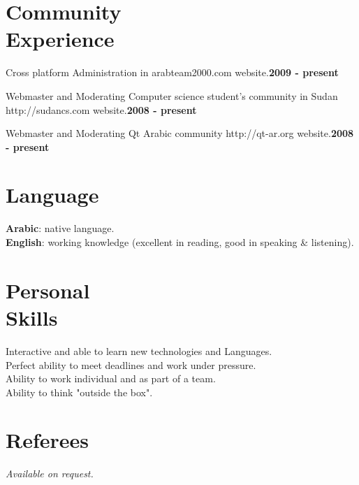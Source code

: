 \documentclass[margin,line]{resume}
\begin{document}
\begin{resume}
\vspace{-2mm}


\section{\mysidestyle  Community\\Experience} 
Cross platform Administration in arabteam2000.com website.\hfill \textbf{2009 - present}\vspace{-3mm}\\\vspace{-1mm}

Webmaster and Moderating Computer science student's community in Sudan http://sudancs.com website.\hfill \textbf{2008 - present}\vspace{-3mm}\\\vspace{-1mm}

Webmaster and Moderating Qt Arabic community http://qt-ar.org website.\hfill \textbf{2008 - present}\vspace{-3mm}\\\vspace{-1mm}

\section{\mysidestyle Language}
	\textbf{Arabic}:   native language.\\
	\textbf{English}: working knowledge (excellent in reading, good in speaking \& listening).\\

\section{\mysidestyle Personal\\Skills}
	Interactive and able to learn new technologies and Languages.\\
	Perfect ability to meet deadlines and work under pressure.\\
	Ability to work individual and as part of a team.\\
	Ability to think "outside the box".

    \section{\mysidestyle Referees} 
    {\sl Available on request.}

\end{resume}
\end{document}
